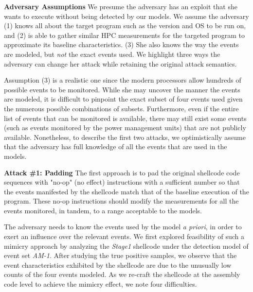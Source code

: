 \documentclass{acm_proc_article-sp}
\begin{document}
\textbf{Adversary Assumptions} \space\space We presume the adversary has 
an exploit that she wants to execute without being detected by our models. 
We assume the adversary (1) knows all about the target 
program such as the version and OS to be run on, and (2) is able to 
gather similar HPC measurements for the targeted program to approximate 
its baseline characteristics. (3) She also knows the way the events are modeled, but \textit{not} the exact events used. We highlight three ways 
the adversary can change her attack while retaining the original 
attack semantics.

Assumption (3) is a realistic one since the modern processors allow 
hundreds of possible events to be monitored. While she may uncover the 
manner the events are modeled, it is difficult to pinpoint the exact 
subset of four events used given the numerous possible combinations of 
subsets. Furthermore, even if the entire list of events that can be 
monitored is available, there may still exist some events (such as events
monitored by the power management units) that are not publicly available.
Nonetheless, to describe the first two attacks, we optimistically assume 
that the adversary has full knowledge of all the events that are used in 
the models.


\textbf{Attack \#1: Padding} \space\space The first approach is to pad 
the original shellcode code sequences with "no-op" (no effect) 
instructions with a sufficient number
so that the events manifested by the shellcode match that of the 
baseline execution of the program. These no-op instructions should modify 
the measurements for all the events monitored, in tandem, to a range 
acceptable to the models.

The adversary needs to know the events used by the model \textit{a priori}, in 
order to exert an influence over the relevant events. We first explored 
feasibility of such a mimicry approach by analyzing the \textit{Stage1} 
shellcode under the detection model of event set \textit{AM-1}. After 
studying the true positive samples, we observe that the event 
characteristics exhibited by the shellcode are due to the unusually low 
counts of the four events modeled. As we re-craft the shellcode at the 
assembly code level to achieve the mimicry effect, we note four difficulties.
\end{document}
